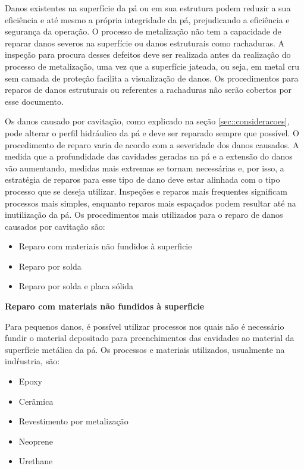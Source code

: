 Danos existentes na superfície da pá ou em sua estrutura podem reduzir a sua
eficiência e até mesmo a própria integridade da pá, prejudicando a eficiência e
segurança da operação. O processo de metalização não tem a capacidade de reparar
danos severos na superfície ou danos estruturais como rachaduras. A inspeção
para procura desses defeitos deve ser realizada antes da realização do processo
de metalização, uma vez que a superfície jateada, ou seja, em metal cru sem
camada de proteção facilita a visualização de danos. Os procedimentos para
reparos de danos estruturais ou referentes a rachaduras não serão cobertos por
esse documento.

Os danos causado por cavitação, como explicado na seção
\ref{sec::consideracoes}, pode alterar o perfil hidráulico da pá e deve ser
reparado sempre que possível. O procedimento de reparo varia de acordo com a
severidade dos danos causados. A medida que a profundidade das cavidades geradas
na pá e a extensão do danos vão aumentando, medidas mais extremas se tornam
necessárias e, por isso, a estratégia de reparos para esse tipo de dano deve
estar alinhada com o tipo processo que se deseja utilizar. Inspeções e reparos
mais frequentes significam processos mais simples, enquanto reparos mais
espaçados podem resultar até na inutilização da pá. Os procedimentos mais
utilizados para o reparo de danos causados por cavitação são:

\begin{itemize}
  \item Reparo com materiais não fundidos à superficie
  \item Reparo por solda
  \item Reparo por solda e placa sólida
\end{itemize}

\textbf{Reparo com materiais não fundidos à superficie}

Para pequenos danos, é possível utilizar processos nos quais não é necessário
fundir o material depositado para preenchimentos das cavidades ao material da
superfície metálica da pá. Os processos e materiais utilizados, usualmente na
indŕustria, são: 

\begin{itemize}
\item Epoxy
\item Cerâmica
\item Revestimento por metalização
\item Neoprene
\item Urethane
\end{itemize}

